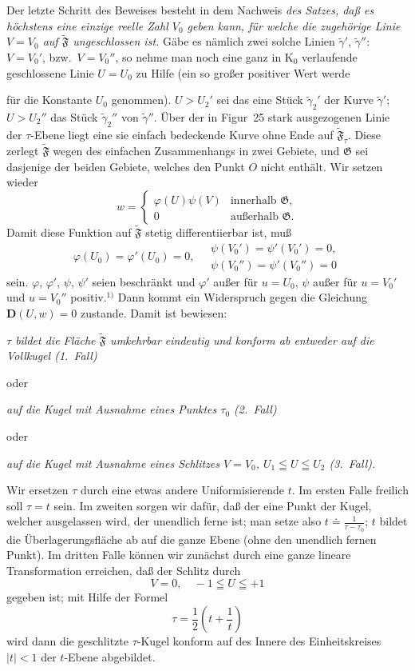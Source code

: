 \documentclass{article}
\begin{document}
Der letzte Schritt des Beweises besteht in dem Nachweis \emph{des Satzes, daß es höchstens eine einzige reelle Zahl $V_0$ geben kann, für welche die zugehörige Linie $V = V_0$ auf $\widetilde{\mathfrak{F}}$ ungeschlossen ist.} Gäbe es nämlich zwei solche Linien $\tilde{\gamma}'$, $\tilde{\gamma}''$: $V = V_0'$, bzw.\ $V = V_0''$, so nehme man noch eine ganz in $\mathrm{K}_0$ verlaufende geschlossene Linie $U = U_0$ zu Hilfe (ein so großer positiver Wert werde

für die Konstante $U_0$ genommen). $U > U_2'$ sei das eine Stück $\tilde{\gamma}_2'$ der Kurve $\tilde{\gamma}'$; $U > U_2''$ das Stück $\tilde{\gamma}_2''$ von $\tilde{\gamma}''$. Über der in Figur~25 stark ausgezogenen Linie der $\tau$-Ebene liegt eine sie einfach bedeckende Kurve ohne Ende auf $\widetilde{\mathfrak{F}}_\tau$. Diese zerlegt $\widetilde{\mathfrak{F}}$ wegen des einfachen Zusammenhangs in zwei Gebiete, und $\mathfrak{G}$ sei dasjenige der beiden Gebiete, welches den Punkt $O$ nicht enthält. Wir setzen wieder
\[ w = \begin{cases} \varphi(U)\psi(V) & \text{innerhalb } \mathfrak{G}, \\ 0 & \text{außerhalb } \mathfrak{G}. \end{cases} \]
Damit diese Funktion auf $\widetilde{\mathfrak{F}}$ stetig differentiierbar ist, muß
\[ \varphi(U_0) = \varphi'(U_0) = 0, \quad \begin{gathered} \psi(V_0') = \psi'(V_0') = 0, \\ \psi(V_0'') = \psi'(V_0'') = 0 \end{gathered} \]
sein. $\varphi$, $\varphi'$, $\psi$, $\psi'$ seien beschränkt und $\varphi'$ außer für $u = U_0$, $\psi$ außer für $u = V_0'$ und $u = V_0''$ positiv.${}^{1)}$ Dann kommt ein Widerspruch gegen die Gleichung $\mathbf{D}(U, w) = 0$ zustande. Damit ist bewiesen:

\emph{$\tau$ bildet die Fläche $\widetilde{\mathfrak{F}}$ umkehrbar eindeutig und konform ab entweder auf die Vollkugel (1.~Fall)}

oder

\emph{auf die Kugel mit Ausnahme eines Punktes $\tau_0$ (2.~Fall)}

oder

\emph{auf die Kugel mit Ausnahme eines Schlitzes $V = V_0$, $U_1 \leqq U \leqq U_2$ (3.~Fall).}

Wir ersetzen $\tau$ durch eine etwas andere Uniformisierende $t$. Im ersten Falle freilich soll $\tau = t$ sein. Im zweiten sorgen wir dafür, daß der eine Punkt der Kugel, welcher ausgelassen wird, der unendlich ferne ist; man setze also $t \doteq \frac{1}{\tau - \tau_0}$; $t$ bildet die Überlagerungsfläche ab auf die ganze Ebene (ohne den unendlich fernen Punkt). Im dritten Falle können wir zunächst durch eine ganze lineare Transformation erreichen, daß der Schlitz durch
\[ V = 0, \quad -1 \leqq U \leqq +1 \]
gegeben ist; mit Hilfe der Formel
\[ \tau = \frac{1}{2} \left( t + \frac{1}{t} \right) \]
wird dann die geschlitzte $\tau$-Kugel konform auf des Innere des Einheitskreises $|t| < 1$ der $t$-Ebene abgebildet.
\end{document}
